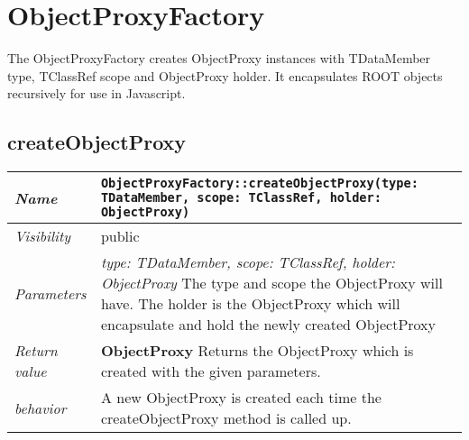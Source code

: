 \chapter{ObjectProxyFactory}
The ObjectProxyFactory creates ObjectProxy instances with TDataMember type, TClassRef scope and ObjectProxy holder. It encapsulates ROOT objects recursively for use in Javascript. 
\section{createObjectProxy}
\begin{longtable}{p{3cm} @{\hskip 1cm} p{12cm}}
 \hline
\textit{Name} & \texttt{ObjectProxyFactory::createObjectProxy(type: TDataMember, scope: TClassRef, holder: ObjectProxy)}\\
\hline
 \textit{Visibility} & public\\
\hline
\textit{Parameters} & \textit{type: TDataMember, scope: TClassRef, holder: ObjectProxy} The type and scope the ObjectProxy will have. The holder is the ObjectProxy which will encapsulate and hold the newly created ObjectProxy\\
\hline
\textit{Return value} & \textbf{ ObjectProxy} Returns the ObjectProxy which is created with the given parameters. \\
  \hline
 \textit{behavior} & A new ObjectProxy is created each time the createObjectProxy method is called up. \\
\hline
\end{longtable} \pagebreak
 